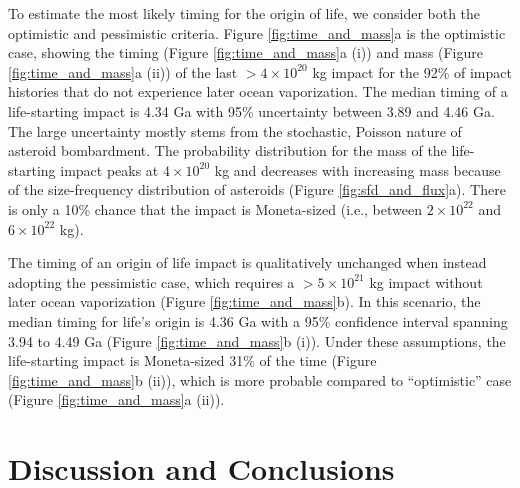 \documentclass[preprint]{aastex63}
\begin{document}
To estimate the most likely timing for the origin of life, we consider both the \citet{Wogan_2023} optimistic and pessimistic criteria. Figure \ref{fig:time_and_mass}a is the optimistic case, showing the timing (Figure \ref{fig:time_and_mass}a (i)) and mass (Figure \ref{fig:time_and_mass}a (ii)) of the last $> 4 \times 10^{20}$ kg impact for the 92\% of impact histories that do not experience later ocean vaporization. The median timing of a life-starting impact is 4.34 Ga with 95\% uncertainty between 3.89 and 4.46 Ga. The large uncertainty mostly stems from the stochastic, Poisson nature of asteroid bombardment. The probability distribution for the mass of the life-starting impact peaks at $4 \times 10^{20}$ kg and decreases with increasing mass because of the size-frequency distribution of asteroids (Figure \ref{fig:sfd_and_flux}a). There is only a 10\% chance that the impact is Moneta-sized (i.e., between $2 \times 10^{22}$ and $6 \times 10^{22}$ kg).

The timing of an origin of life impact is qualitatively unchanged when instead adopting the \citet{Wogan_2023} pessimistic case, which requires a $> 5 \times 10^{21}$ kg impact without later ocean vaporization (Figure \ref{fig:time_and_mass}b). In this scenario, the median timing for life's origin is 4.36 Ga with a 95\% confidence interval spanning 3.94 to 4.49 Ga (Figure \ref{fig:time_and_mass}b (i)). Under these assumptions, the life-starting impact is Moneta-sized 31\% of the time (Figure \ref{fig:time_and_mass}b (ii)), which is more probable compared to ``optimistic'' case (Figure \ref{fig:time_and_mass}a (ii)).


\section{Discussion and Conclusions}
\end{document}
